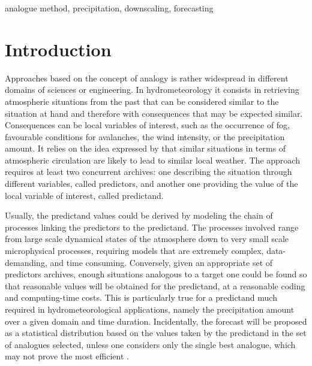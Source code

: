 \documentclass[review]{elsarticle}
\begin{document}
\begin{frontmatter}
\begin{abstract}
The Optimizer integrates the common semi-automatic sequential approach, as well as Monte\textendash Carlo analyses, and a global optimization technique by means of Genetic Algorithms. 

\end{abstract}

\begin{keyword}
analogue method, precipitation, downscaling, forecasting
\end{keyword}

\end{frontmatter}

\linenumbers


\section{Introduction}

Approaches based on the concept of analogy is rather widespread in different domains of sciences or engineering. In hydrometeorology it consists in retrieving atmospheric situations from the past that can be considered similar to the situation at hand and therefore with consequences that may be expected similar. Consequences can be local variables of interest, such as the occurrence of fog, favourable conditions for avalanches, the wind intensity, or the precipitation amount. It relies on the idea expressed by \citet{Lorenz1956, Lorenz1969} that similar situations in terms of atmospheric circulation are likely to lead to similar local weather. The approach requires at least two concurrent archives: one describing the situation through different variables, called predictors, and another one providing the value of the local variable of interest, called predictand.

Usually, the predictand values could be derived by modeling the chain of processes linking the predictors to the predictand. The processes involved range from large scale dynamical states of the atmosphere down to very small scale microphysical processes, requiring models that are extremely complex, data-demanding, and time consuming. Conversely, given an appropriate set of predictors archives, enough situations analogous to a target one could be found so that reasonable values will be obtained for the predictand, at a reasonable coding and computing-time costs. This is particularly true for a predictand much required in hydrometeorological applications, namely the precipitation amount over a given domain and time duration. Incidentally, the forecast will be proposed as a statistical distribution based on the values taken by the predictand in the set of analogues selected, unless one considers only the single best analogue, which may not prove the most efficient \citep{Bontron2005}.
\end{document}
